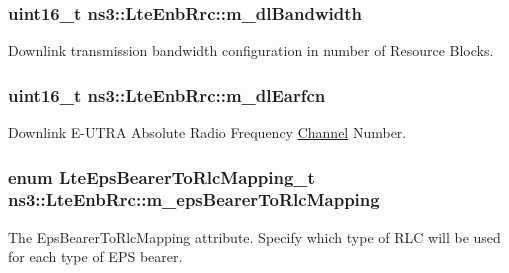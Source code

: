 \subsubsection[{\texorpdfstring{m\+\_\+dl\+Bandwidth}{m_dlBandwidth}}]{\setlength{\rightskip}{0pt plus 5cm}uint16\+\_\+t ns3\+::\+Lte\+Enb\+Rrc\+::m\+\_\+dl\+Bandwidth\hspace{0.3cm}{\ttfamily [private]}}\hypertarget{classns3_1_1LteEnbRrc_afb2dd8321c2d4733572c9240f7bc9751}{}\label{classns3_1_1LteEnbRrc_afb2dd8321c2d4733572c9240f7bc9751}


Downlink transmission bandwidth configuration in number of Resource Blocks. 

\subsubsection[{\texorpdfstring{m\+\_\+dl\+Earfcn}{m_dlEarfcn}}]{\setlength{\rightskip}{0pt plus 5cm}uint16\+\_\+t ns3\+::\+Lte\+Enb\+Rrc\+::m\+\_\+dl\+Earfcn\hspace{0.3cm}{\ttfamily [private]}}\hypertarget{classns3_1_1LteEnbRrc_aee99fe7a94ae8ef45983f580e36be04a}{}\label{classns3_1_1LteEnbRrc_aee99fe7a94ae8ef45983f580e36be04a}


Downlink E-\/\+U\+T\+RA Absolute Radio Frequency \hyperlink{classns3_1_1Channel}{Channel} Number. 

\subsubsection[{\texorpdfstring{m\+\_\+eps\+Bearer\+To\+Rlc\+Mapping}{m_epsBearerToRlcMapping}}]{\setlength{\rightskip}{0pt plus 5cm}enum {\bf Lte\+Eps\+Bearer\+To\+Rlc\+Mapping\+\_\+t} ns3\+::\+Lte\+Enb\+Rrc\+::m\+\_\+eps\+Bearer\+To\+Rlc\+Mapping\hspace{0.3cm}{\ttfamily [private]}}\hypertarget{classns3_1_1LteEnbRrc_ad90d6c8a5ef8ee123ba68498cc20df5c}{}\label{classns3_1_1LteEnbRrc_ad90d6c8a5ef8ee123ba68498cc20df5c}
The {\ttfamily Eps\+Bearer\+To\+Rlc\+Mapping} attribute. Specify which type of R\+LC will be used for each type of E\+PS bearer. 
